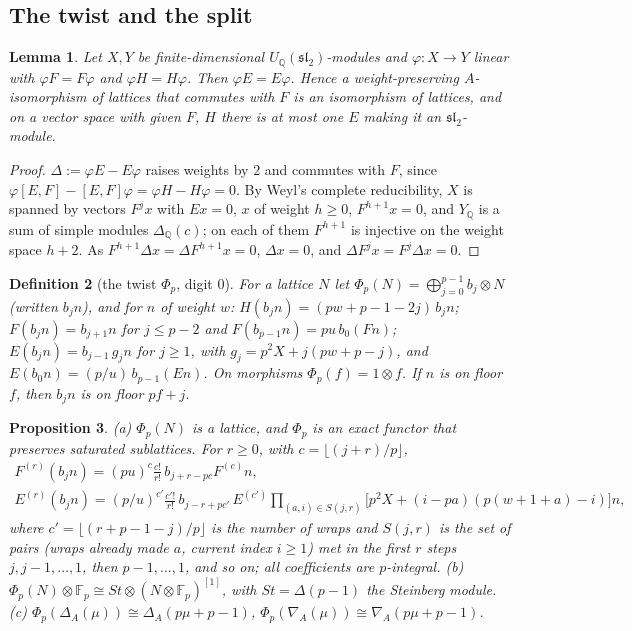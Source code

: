 \documentclass[10pt]{article}
\theoremstyle{ds}
\newtheorem{lemma}{Lemma}
\newtheorem{proposition}[lemma]{Proposition}
\newtheorem{definition}[lemma]{Definition}
\theoremstyle{dsrem}
\newcommand{\Q}{\mathbb{Q}}
\newcommand{\F}{\mathbb{F}}
\begin{document}
\subsection{The twist and the split}

\begin{lemma}\label{EFH}
Let $X,Y$ be finite-dimensional $U_\Q(\mathfrak{sl}_2)$-modules and $\varphi\colon X\to Y$ linear with $\varphi F=F\varphi$ and $\varphi H=H\varphi$. Then $\varphi E=E\varphi$. Hence a weight-preserving $A$-isomorphism of lattices that commutes with $F$ is an isomorphism of lattices, and on a vector space with given $F$, $H$ there is at most one $E$ making it an $\mathfrak{sl}_2$-module.
\end{lemma}

\begin{proof}
$\Delta:=\varphi E-E\varphi$ raises weights by $2$ and commutes with $F$, since $\varphi[E,F]-[E,F]\varphi=\varphi H-H\varphi=0$. By Weyl's complete reducibility, $X$ is spanned by vectors $F^jx$ with $Ex=0$, $x$ of weight $h\ge0$, $F^{h+1}x=0$, and $Y_\Q$ is a sum of simple modules $\Delta_\Q(c)$; on each of them $F^{h+1}$ is injective on the weight space $h+2$. As $F^{h+1}\Delta x=\Delta F^{h+1}x=0$, $\Delta x=0$, and $\Delta F^jx=F^j\Delta x=0$.
\end{proof}

\begin{definition}[the twist $\Phi_p$, digit $0$]\label{defPhi}
For a lattice $N$ let $\Phi_p(N)=\bigoplus_{j=0}^{p-1}b_j\otimes N$ (written $b_jn$), and for $n$ of weight $w$:
$H(b_jn)=(pw+p-1-2j)\,b_jn$; $F(b_jn)=b_{j+1}n$ for $j\le p-2$ and $F(b_{p-1}n)=pu\,b_0(Fn)$; $E(b_jn)=b_{j-1}\,g_jn$ for $j\ge1$, with $g_j=p^2X+j(pw+p-j)$, and $E(b_0n)=(p/u)\,b_{p-1}(En)$. On morphisms $\Phi_p(f)=1\otimes f$. If $n$ is on floor $f$, then $b_jn$ is on floor $pf+j$.
\end{definition}

\begin{proposition}\label{propPhi}
(a) $\Phi_p(N)$ is a lattice, and $\Phi_p$ is an exact functor that preserves saturated sublattices. For $r\ge0$, with $c=\lfloor(j+r)/p\rfloor$,
\begin{gather*}
F^{(r)}(b_jn)=(pu)^c\tfrac{c!}{r!}\,b_{j+r-pc}F^{(c)}n,\\
E^{(r)}(b_jn)=(p/u)^{c'}\tfrac{c'!}{r!}\,b_{j-r+pc'}\,E^{(c')}\!\!\prod_{(a,i)\in S(j,r)}\!\!\big[p^2X+(i-pa)(p(w+1+a)-i)\big]n,
\end{gather*}
where $c'=\lfloor(r+p-1-j)/p\rfloor$ is the number of wraps and $S(j,r)$ is the set of pairs (wraps already made $a$, current index $i\ge1$) met in the first $r$ steps $j,j-1,\dots,1$, then $p-1,\dots,1$, and so on; all coefficients are $p$-integral.
(b) $\Phi_p(N)\otimes\F_p\cong St\otimes(N\otimes\F_p)^{[1]}$, with $St=\Delta(p-1)$ the Steinberg module.
(c) $\Phi_p(\Delta_A(\mu))\cong\Delta_A(p\mu+p-1)$, $\Phi_p(\nabla_A(\mu))\cong\nabla_A(p\mu+p-1)$.
\end{proposition}
\end{document}
